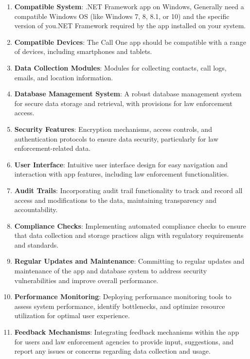 \begin{enumerate}[label=\arabic*.]
    \item \textbf{Compatible System}:  .NET Framework app on Windows, Generally need a compatible Windows OS (like Windows 7, 8, 8.1, or 10) and the specific version of you.NET Framework required by the app installed on your system.
    \item \textbf{Compatible Devices}: The Call One app should be compatible with a range of devices, including smartphones and tablets.
    \item \textbf{Data Collection Modules}: Modules for collecting contacts, call logs, emails, and location information.
    \item \textbf{Database Management System}: A robust database management system for secure data storage and retrieval, with provisions for law enforcement access.
    \item \textbf{Security Features}: Encryption mechanisms, access controls, and authentication protocols to ensure data security, particularly for law enforcement-related data.
    \item \textbf{User Interface}: Intuitive user interface design for easy navigation and interaction with app features, including law enforcement functionalities.
    \item \textbf{Audit Trails}: Incorporating audit trail functionality to track and record all access and modifications to the data, maintaining transparency and accountability.
    \item \textbf{Compliance Checks}: Implementing automated compliance checks to ensure that data collection and storage practices align with regulatory requirements and standards.
    \item \textbf{Regular Updates and Maintenance}: Committing to regular updates and maintenance of the app and database system to address security vulnerabilities and improve overall performance.
    \item \textbf{Performance Monitoring}: Deploying performance monitoring tools to assess system performance, identify bottlenecks, and optimize resource utilization for optimal user experience.
    \item \textbf{Feedback Mechanisms}: Integrating feedback mechanisms within the app for users and law enforcement agencies to provide input, suggestions, and report any issues or concerns regarding data collection and usage.
\end{enumerate}
